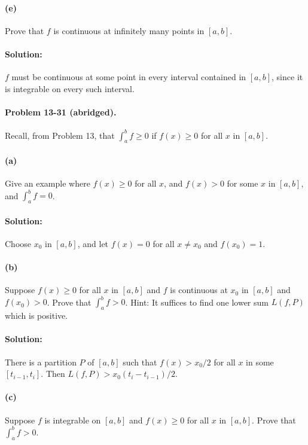 \documentclass{article}
\begin{document}
\paragraph{(e)} Prove that $f$ is continuous at infinitely many points in $[a,
b]$.

\paragraph{Solution:} $f$ must be continuous at some point in every interval
contained in $[a, b]$, since it is integrable on every such interval.

\paragraph{Problem 13-31 (abridged).} Recall, from Problem 13, that $\int_a^b f
\geq 0$ if $f(x) \geq 0$ for all $x$ in $[a, b]$.

\paragraph{(a)} Give an example where $f(x) \geq 0$ for all $x$, and $f(x) > 0$
for some $x$ in $[a, b]$, and $\int_a^b f = 0$.

\paragraph{Solution:} Choose $x_0$ in $[a, b]$, and let $f(x) = 0$ for all $x
\neq x_0$ and $f(x_0) = 1$.

\paragraph{(b)} Suppose $f(x) \geq 0$ for all $x$ in $[a, b]$ and $f$ is
continuous at $x_0$ in $[a, b]$ and $f(x_0) > 0$. Prove that $\int_a^b f > 0$.
Hint: It suffices to find one lower sum $L(f, P)$ which is positive.

\paragraph{Solution:} There is a partition $P$ of $[a, b]$ such that $f(x) >
x_0/2$ for all $x$ in some $[t_{i - 1}, t_i]$. Then $L(f, P) > x_0(t_i -
t_{i - 1})/2$.

\paragraph{(c)} Suppose $f$ is integrable on $[a, b]$ and $f(x) \geq 0$ for all
$x$ in $[a, b]$. Prove that $\int_a^b f > 0$.
\end{document}
